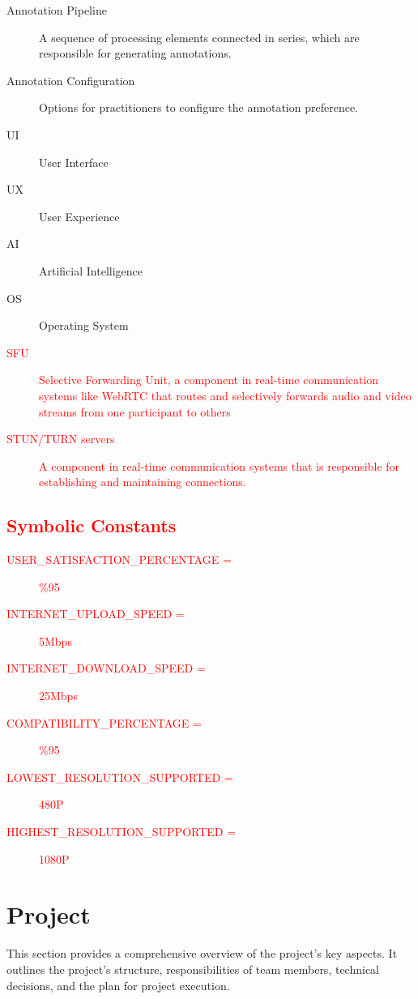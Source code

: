 \documentclass[12pt]{article}
\begin{document}
\begin{description}
    \item[Annotation Pipeline] A sequence of processing elements connected in series, which are responsible for generating annotations.
    \item[Annotation Configuration] Options for practitioners to configure the annotation preference.
    \item[UI] User Interface
    \item[UX] User Experience
    \item[AI] Artificial Intelligence
    \item[OS] Operating System
    \item[\textcolor{red}{SFU}] \textcolor{red}{Selective Forwarding Unit, a component in real-time communication systems like WebRTC
    that routes and selectively forwards audio and video streams from one participant to others}
    \item[\textcolor{red}{STUN/TURN servers}] \textcolor{red}{A component in real-time communication systems that is responsible for
    establishing and maintaining connections.}
\end{description}

\subsection{\textcolor{red}{Symbolic Constants}}\label{sec:symbolic-constants}
\begin{description}
    \item[\textcolor{red}{USER\_SATISFACTION\_PERCENTAGE =}] \textcolor{red}{\%95}
    \item[\textcolor{red}{INTERNET\_UPLOAD\_SPEED =}] \textcolor{red}{5Mbps} 
    \item[\textcolor{red}{INTERNET\_DOWNLOAD\_SPEED =}] \textcolor{red}{25Mbps} 
    \item[\textcolor{red}{COMPATIBILITY\_PERCENTAGE =}] \textcolor{red}{\%95}
    \item[\textcolor{red}{LOWEST\_RESOLUTION\_SUPPORTED =}] \textcolor{red}{480P}
    \item[\textcolor{red}{HIGHEST\_RESOLUTION\_SUPPORTED =}] \textcolor{red}{1080P}
\end{description}

\section{Project}
This section provides a comprehensive overview of the project’s key aspects. It outlines the project’s structure, responsibilities of team members, technical decisions, and the plan for project execution.
\end{document}
